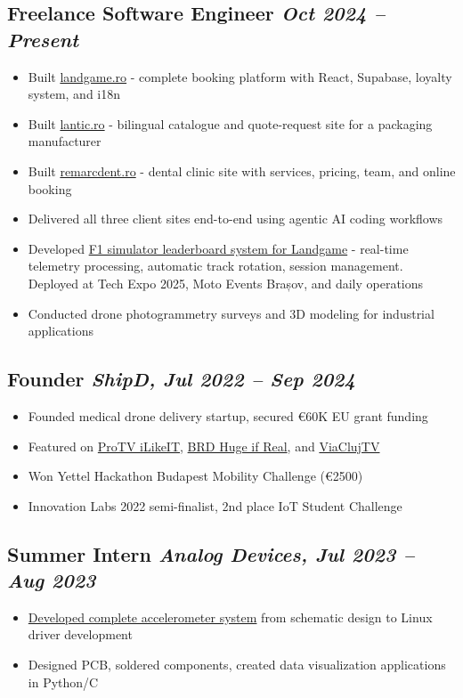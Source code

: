 \documentclass[11pt,a4paper]{article}
\begin{document}
\subsection*{Freelance Software Engineer \hfill \textit{Oct 2024 -- Present}}
\begin{itemize}
    \item Built \href{https://landgame.ro/}{landgame.ro} - complete booking platform with React, Supabase, loyalty system, and i18n
    \item Built \href{https://lantic.ro/}{lantic.ro} - bilingual catalogue and quote-request site for a packaging manufacturer
    \item Built \href{https://remarcdent.ro/}{remarcdent.ro} - dental clinic site with services, pricing, team, and online booking
    \item Delivered all three client sites end-to-end using agentic AI coding workflows
    \item Developed \href{https://voic.ro/blog/ai-powered-f1-leaderboard.html}{F1 simulator leaderboard system for Landgame} - real-time telemetry processing, automatic track rotation, session management. Deployed at Tech Expo 2025, Moto Events Brașov, and daily operations
    \item Conducted drone photogrammetry surveys and 3D modeling for industrial applications
\end{itemize}

\subsection*{Founder \hfill \textit{ShipD, Jul 2022 -- Sep 2024}}
\begin{itemize}
    \item Founded medical drone delivery startup, secured €60K EU grant funding
    \item Featured on \href{https://stirileprotv.ro/stiri/ilikeit/ilikeit-proiect-al-unor-studenti-din-cluj-dotarea-serviciilor-medicale-de-urgenta-cu-drone.html}{ProTV iLikeIT}, \href{https://www.youtube.com/watch?v=GgeAACTfDI0}{BRD Huge if Real}, and \href{https://www.youtube.com/watch?v=C1V9CzapsNY&t=2s}{ViaClujTV}
    \item Won Yettel Hackathon Budapest Mobility Challenge (€2500)
    \item Innovation Labs 2022 semi-finalist, 2nd place IoT Student Challenge
\end{itemize}

\subsection*{Summer Intern \hfill \textit{Analog Devices, Jul 2023 -- Aug 2023}}
\begin{itemize}
    \item \href{https://www.canva.com/design/DAFppT8dTg4/J_LfDK-I4AsbbVzp5bYXzQ/view?utm_content=DAFppT8dTg4&utm_campaign=designshare&utm_medium=link&utm_source=editor#1}{Developed complete accelerometer system} from schematic design to Linux driver development
    \item Designed PCB, soldered components, created data visualization applications in Python/C
\end{itemize}
\end{document}
